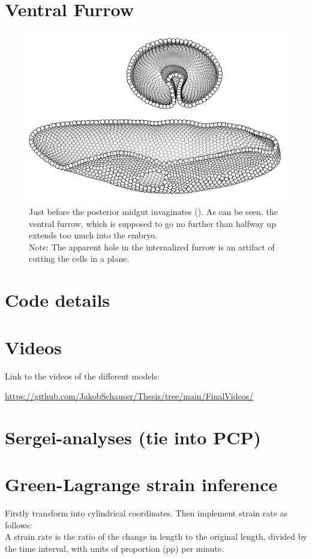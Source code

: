\section{Ventral Furrow}
\label{App:VF}
\begin{figure}[H]
    \centering
    \includegraphics[width=0.9\linewidth]{chapters/Appendix/cross_sections.png}
    \caption{Just before the posterior midgut invaginates (). As can be seen, the ventral furrow, which is supposed to go no further than halfway up extends too much into the embryo. \\Note: The apparent hole in the internalized furrow is an artifact of cutting the cells in a plane.}
    \label{fig:enter-label}
\end{figure}
\section{Code details}
\label{App:Code}
\section{Videos}
\label{App:videos}
Link to the videos of the different models:

\url{https://github.com/JakobSchauser/Thesis/tree/main/FinalVideos/}
\section{Sergei-analyses (tie into PCP)}
\label{App:Sergei}

\section{Green-Lagrange strain inference}
\label{App:Strain-Calculation}
Firstly transform into cylindrical coordinates. Then implement strain rate as follows:\\
A strain rate is the ratio of the change in length to the original length, divided by the time interval, with units of proportion (pp) per minute.

